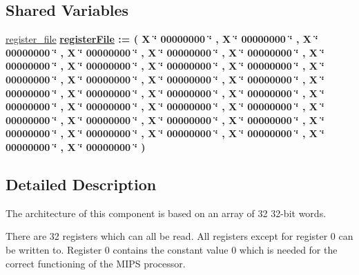 \subsection*{\-Shared \-Variables}
 \begin{DoxyCompactItemize}
\item 
\hypertarget{classregister__file_1_1behavioral_ab8a5b65dc9034963fa0d029a5d7c5534}{\hyperlink{classregister__file_1_1behavioral_ab8a5b65dc9034963fa0d029a5d7c5534}{register\-\_\-file} {\bfseries {\bfseries \hyperlink{classregister__file_1_1behavioral_a312e330e12c981e3094d8419afb16a58}{register\-File}}   \-:=  (  \-X \char`\"{} 00000000 \char`\"{} ,  \-X \char`\"{} 00000000 \char`\"{} ,  \-X \char`\"{} 00000000 \char`\"{} ,  \-X \char`\"{} 00000000 \char`\"{} ,  \-X \char`\"{} 00000000 \char`\"{} ,  \-X \char`\"{} 00000000 \char`\"{} ,  \-X \char`\"{} 00000000 \char`\"{} ,  \-X \char`\"{} 00000000 \char`\"{} ,  \-X \char`\"{} 00000000 \char`\"{} ,  \-X \char`\"{} 00000000 \char`\"{} ,  \-X \char`\"{} 00000000 \char`\"{} ,  \-X \char`\"{} 00000000 \char`\"{} ,  \-X \char`\"{} 00000000 \char`\"{} ,  \-X \char`\"{} 00000000 \char`\"{} ,  \-X \char`\"{} 00000000 \char`\"{} ,  \-X \char`\"{} 00000000 \char`\"{} ,  \-X \char`\"{} 00000000 \char`\"{} ,  \-X \char`\"{} 00000000 \char`\"{} ,  \-X \char`\"{} 00000000 \char`\"{} ,  \-X \char`\"{} 00000000 \char`\"{} ,  \-X \char`\"{} 00000000 \char`\"{} ,  \-X \char`\"{} 00000000 \char`\"{} ,  \-X \char`\"{} 00000000 \char`\"{} ,  \-X \char`\"{} 00000000 \char`\"{} ,  \-X \char`\"{} 00000000 \char`\"{} ,  \-X \char`\"{} 00000000 \char`\"{} ,  \-X \char`\"{} 00000000 \char`\"{} ,  \-X \char`\"{} 00000000 \char`\"{} ,  \-X \char`\"{} 00000000 \char`\"{} ,  \-X \char`\"{} 00000000 \char`\"{} ,  \-X \char`\"{} 00000000 \char`\"{} ,  \-X \char`\"{} 00000000 \char`\"{}  ) } }\label{classregister__file_1_1behavioral_ab8a5b65dc9034963fa0d029a5d7c5534}

\end{DoxyCompactItemize}


\subsection{\-Detailed \-Description}
\-The architecture of this component is based on an array of 32 32-\/bit words. 

\-There are 32 registers which can all be read. \-All registers except for register 0 can be written to. \-Register 0 contains the constant value 0 which is needed for the correct functioning of the \-M\-I\-P\-S processor. 


